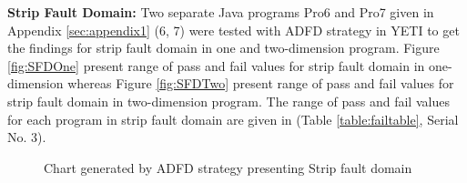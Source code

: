 


\noindent \textbf{Strip Fault Domain:} Two separate Java programs Pro6 and Pro7 given in Appendix \ref{sec:appendix1} (6, 7) were tested with ADFD strategy in YETI to get the findings for strip fault domain in one and two-dimension program. Figure \ref{fig:SFDOne} present range of pass and fail values for strip fault domain in one-dimension whereas Figure \ref{fig:SFDTwo} present range of pass and fail values for strip fault domain in two-dimension program. The range of pass and fail values for each program in strip fault domain are given in (Table \ref{table:failtable}, Serial No. 3).


%
\begin{figure} [H]



\caption{Chart generated by ADFD strategy presenting Strip fault domain}
\end{figure}








